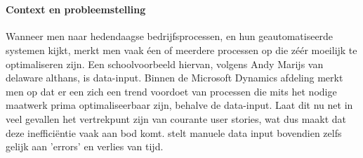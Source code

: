 
\chapter{}
\label{ch:inleiding}



\section{}
\label{sec:probleemstelling}

\subsubsection{Context en probleemstelling}
Wanneer men naar hedendaagse bedrijfsprocessen, en hun geautomatiseerde systemen kijkt, merkt men vaak éen of meerdere processen op die zéér moeilijk te optimaliseren zijn. Een schoolvoorbeeld hiervan, volgens Andy Marijs van delaware althans, is data-input. Binnen de Microsoft Dynamics afdeling merkt men op dat er een zich een trend voordoet van processen die mits het nodige maatwerk prima optimaliseerbaar zijn, behalve de data-input. Laat dit nu net in veel gevallen het vertrekpunt zijn van courante user stories, wat dus maakt dat deze inefficiëntie vaak aan bod komt. \textcite{TimeXtender2019} stelt manuele data input bovendien zelfs gelijk aan 'errors' en verlies van tijd.

